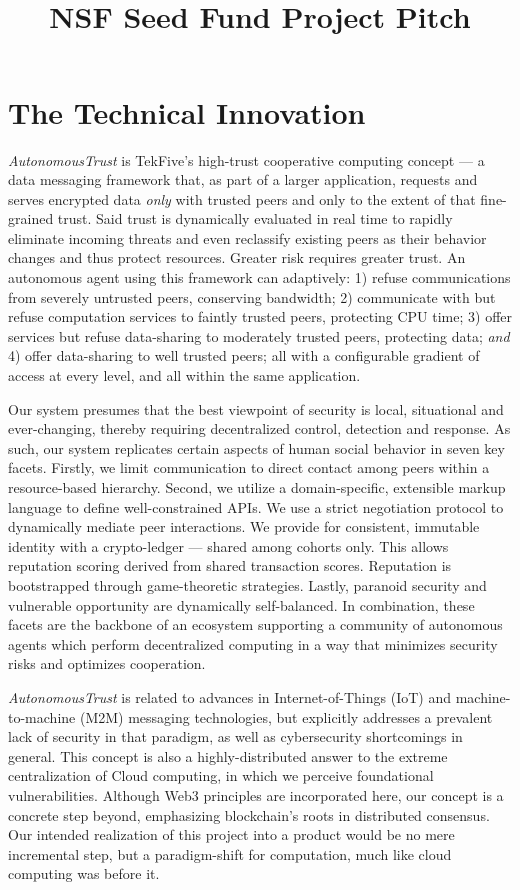 \documentclass[10pt]{article}
\title{\textbf{\huge \projectName}\\ NSF Seed Fund Project Pitch %
\vspace{-2em}%
}
\date{\monthname{} \the\year}
\newcommand{\projectName}{\emph{AutonomousTrust }}
\begin{document}
	
\TekFiveTitle[0in]

\section{The Technical Innovation}\label{sec:innovation}

\projectName is TekFive's high-trust cooperative computing concept --- a data messaging framework that, as part of a larger application, requests and serves encrypted data \textit{only} with trusted peers and only to the extent of that fine-grained trust.
Said trust is dynamically evaluated in real time to rapidly eliminate incoming threats and even reclassify existing peers as their behavior changes and thus protect resources.
Greater risk requires greater trust.
An autonomous agent using this framework can adaptively: 1) refuse communications from severely untrusted peers, conserving bandwidth; 2) communicate with but refuse computation services to faintly trusted peers, protecting CPU time; 3) offer services but refuse data-sharing to moderately trusted peers, protecting data; \textit{and} 4) offer data-sharing to well trusted peers; all with a configurable gradient of access at every level, and all within the same application.

Our system presumes that the best viewpoint of security is local, situational and ever-changing, thereby requiring decentralized control, detection and response.
As such, our system replicates certain aspects of human social behavior in seven key facets.
Firstly, we limit communication to direct  contact among peers within a resource-based hierarchy.
Second, we utilize a domain-specific, extensible markup language to define well-constrained APIs.
We use a strict negotiation protocol to dynamically mediate peer interactions.
We provide for consistent, immutable identity with a crypto-ledger --- shared among cohorts only.
This allows reputation scoring derived from shared transaction scores.
Reputation is bootstrapped through game-theoretic strategies.
Lastly, paranoid security and vulnerable opportunity are dynamically self-balanced.
In combination, these facets are the backbone of an ecosystem supporting a community of autonomous agents which perform decentralized computing in a way that minimizes security risks and optimizes cooperation.

\projectName is related to advances in Internet-of-Things (IoT) and machine-to-machine (M2M) messaging technologies, but explicitly addresses a prevalent lack of security in that paradigm, as well as cybersecurity shortcomings in general.
This concept is also a highly-distributed answer to the extreme centralization of Cloud computing, in which we perceive foundational vulnerabilities.
Although Web3 principles are incorporated here, our concept is a concrete step beyond, emphasizing blockchain's roots in distributed consensus.
Our intended realization of this project into a product would be no mere incremental step, but a paradigm-shift for computation, much like cloud computing was before it.
\end{document}
